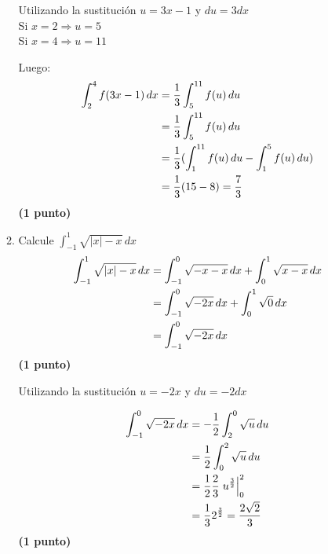 \documentclass[letterpaper,10pt]{article}
\newcommand{\dis}{\displaystyle}
\providecommand{\abs}[1]{\lvert#1\rvert}
\begin{document}
\begin{enumerate}
\begin{enumerate}[label=\emph{\alph*)}]
Utilizando la sustitución $u = 3x - 1$ y $du = 3 dx$\\
Si $x=2 \Rightarrow u =5$\\
Si $x=4 \Rightarrow u =11$

Luego:
\begin{align*}
 \dis   \int_2^{4} f(3x-1)\, dx &=  \frac{1}{3}\int_5^{11} f(u)\,du\\
 \dis   &= \frac{1}{3}\int_5^{11} f(u)\, du\\
  \dis   &= \frac{1}{3}(\int_1^{11} f(u)\, du-\int_1^{5} f(u)\, du)\\
  \dis   &= \frac{1}{3}(15-8) = \frac{7}{3}\\
\end{align*}
\dotfill \textbf{(1 punto)}

\item Calcule $\dis \int_{-1}^{1} \sqrt{\abs{x}-x} \, dx$\\

\begin{align*}
 \dis  \int_{-1}^{1} \sqrt{\abs{x}-x} \, dx &=  \int_{-1}^{0} \sqrt{-x-x} \, dx + \int_{0}^{1} \sqrt{x-x} \, dx\\
 \dis   &= \int_{-1}^{0} \sqrt{-2x} \, dx + \int_{0}^{1} \sqrt{0} \, dx\\
  \dis   &= \int_{-1}^{0} \sqrt{-2x} \, dx 
\end{align*}
\dotfill \textbf{(1 punto)}

Utilizando la sustitución $u=-2x$ y $du=-2dx$


\begin{align*}
 \dis  \int_{-1}^{0} \sqrt{-2x} \, dx &= -\frac{1}{2} \int_{2}^{0} \sqrt{u} \, du\\
 \dis   &= \frac{1}{2} \int_{0}^{2} \sqrt{u} \, du\\
  \dis   &= \frac{1}{2} \frac{2}{3} \left.u^{\frac{3}{2}}\right|_0^2\\
  \dis   &= \frac{1}{3} 2^{\frac{3}{2}} = \frac{2 \sqrt{2}}{3}\\
\end{align*}
\dotfill \textbf{(1 punto)}
\end{enumerate}




\end{enumerate}




\vspace{10mm}
\end{document}
